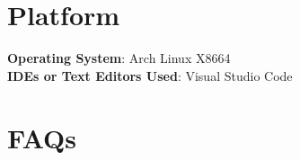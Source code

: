 \documentclass[11pt]{article}
\begin{document}
\section{Platform}
\textbf{Operating System}: Arch Linux X8664 \\
\textbf{IDEs or Text Editors Used}: Visual Studio Code\\

% 

\section{FAQs}
\end{document}
